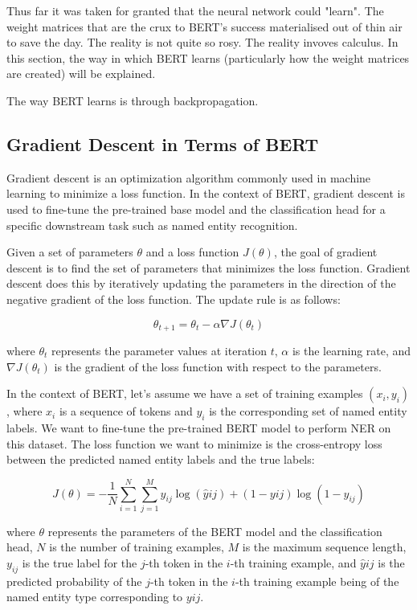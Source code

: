 
Thus far it was taken for granted that the neural network could "learn". The weight matrices that are the crux to BERT's success materialised out of thin air to save the day. The reality is not quite so rosy. The reality invoves calculus.
In this section, the way in which BERT learns (particularly how the weight matrices are created) will be explained.

The way BERT learns is through backpropagation. 

\subsection{Gradient Descent in Terms of BERT}

Gradient descent is an optimization algorithm commonly used in machine learning to minimize a loss function. In the context of BERT, gradient descent is used to fine-tune the pre-trained base model and the classification head for a specific downstream task such as named entity recognition. 

Given a set of parameters $\theta$ and a loss function $J(\theta)$, the goal of gradient descent is to find the set of parameters that minimizes the loss function. Gradient descent does this by iteratively updating the parameters in the direction of the negative gradient of the loss function. The update rule is as follows:

$$\theta_{t+1} = \theta_t - \alpha \nabla J(\theta_t)$$

where $\theta_t$ represents the parameter values at iteration $t$, $\alpha$ is the learning rate, and $\nabla J(\theta_t)$ is the gradient of the loss function with respect to the parameters.

In the context of BERT, let's assume we have a set of training examples $(x_i, y_i)$, where $x_i$ is a sequence of tokens and $y_i$ is the corresponding set of named entity labels. We want to fine-tune the pre-trained BERT model to perform NER on this dataset. The loss function we want to minimize is the cross-entropy loss between the predicted named entity labels and the true labels:

$$J(\theta) = -\frac{1}{N} \sum_{i=1}^N \sum_{j=1}^M y_{ij} \log(\hat{y}{ij}) + (1 - y{ij}) \log(1 - \hat{y}_{ij})$$

where $\theta$ represents the parameters of the BERT model and the classification head, $N$ is the number of training examples, $M$ is the maximum sequence length, $y_{ij}$ is the true label for the $j$-th token in the $i$-th training example, and $\hat{y}{ij}$ is the predicted probability of the $j$-th token in the $i$-th training example being of the named entity type corresponding to $y{ij}$.

